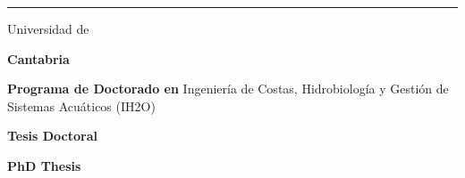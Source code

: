 \begin{titlepage}
\setlength{\parindent}{0pt}
\sffamily

\noindent
{\color{ucprimary}\rule[0.42cm]{\dimexpr\textwidth-2.15cm\relax}{0.7pt}}%
\hfill
\colorbox{ucprimary}{\parbox[c][0.95cm]{1.85cm}{%
  \centering\color{white}\fontsize{16}{18}\selectfont\textbf{\ThesisDate}}}

\vspace{-0.15cm}
{\color{ucprimary}\fontsize{19}{23}\selectfont Universidad de\par}
\vspace{1pt}
{\color{ucprimary}\fontsize{19}{23}\selectfont\textbf{Cantabria}\par}

\vspace{10pt}

{\color{ucprimary}\fontsize{11.5}{15}\selectfont\textbf{Programa de Doctorado en}
 Ingeniería de Costas, Hidrobiología y Gestión de Sistemas Acuáticos (IH2O)\par}

\vspace{1.7cm}

{\color{ucsecondary}\fontsize{21}{25}\selectfont\bfseries Tesis Doctoral\par}

\vspace{0.35cm}

{\color{ucprimary}\raggedright\fontsize{21}{26}\selectfont\bfseries
  \MakeUppercase{\ThesisTitleES}\par}

\vspace{0.75cm}

{\color{ucsecondary}\fontsize{16}{20}\selectfont\bfseries PhD Thesis\par}

\vspace{0.3cm}

{\color{ucprimary}\raggedright\fontsize{15}{19}\selectfont\bfseries
  \MakeUppercase{\ThesisTitleEN}\par}


\end{titlepage}
